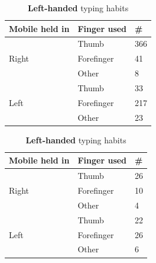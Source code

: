     \begin{table}[H]
      \parbox{.5\linewidth}{
        \centering
        \begin{tabular}{ l | l | l }
          \hline
          {\bf Mobile held in} & {\bf Finger used} & {\bf \#} \\ \hline
          \multirow{3}{*}{Right} & Thumb & 366 \\
          & Forefinger & 41 \\
          & Other & 8 \\ \hline
          \multirow{3}{*}{Left} & Thumb & 33 \\
          & Forefinger & 217 \\
          & Other & 23 \\ \hline
        \end{tabular}
        \caption{{\bf Right-handed} typing habits}
        \label{tab:righthandfinger}
      }
      \hfill
      \parbox{.5\linewidth}{
        \centering
        \begin{tabular}{ l | l | l }
          \hline
          {\bf Mobile held in} & {\bf Finger used} & {\bf \#} \\ \hline
          \multirow{3}{*}{Right} & Thumb & 26 \\ 
          & Forefinger & 10 \\
          & Other & 4 \\ \hline
          \multirow{3}{*}{Left} & Thumb & 22 \\ 
          & Forefinger & 26 \\
          & Other & 6 \\ \hline
        \end{tabular}
        \caption{{\bf Left-handed} typing habits}
        \label{tab:lefthandfinger}
      }
    \end{table}

